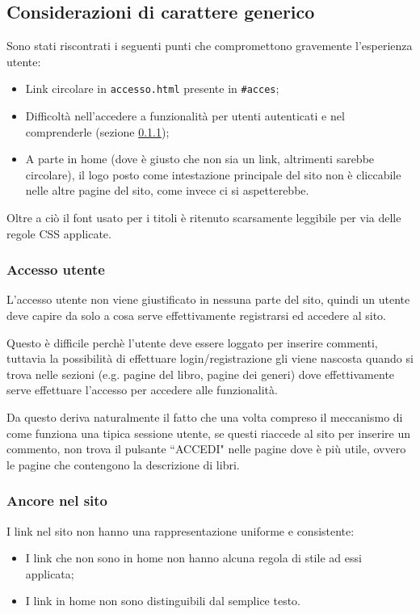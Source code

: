 \subsection{Considerazioni di carattere generico}
Sono stati riscontrati i seguenti punti che compromettono gravemente
l'esperienza utente:
\begin{itemize}
\item Link circolare in \texttt{accesso.html} presente in \texttt{\#acces};
\item Difficoltà nell'accedere a funzionalità per utenti autenticati e nel
comprenderle (sezione \ref{sec:user-login});
\item A parte in home (dove è giusto che non sia un link, altrimenti sarebbe
circolare), il logo posto come intestazione principale del sito non è
cliccabile nelle altre pagine del sito, come invece ci si aspetterebbe.
\end{itemize}

Oltre a ciò il font usato per i titoli è ritenuto scarsamente leggibile per
via delle regole CSS applicate.

\subsubsection{Accesso utente}\label{sec:user-login}
L'accesso utente non viene giustificato in nessuna parte del sito, quindi un
utente deve capire da solo a cosa serve effettivamente registrarsi ed accedere
al sito.

Questo è difficile perchè l'utente deve essere loggato per inserire commenti,
tuttavia la possibilità di effettuare login/registrazione gli viene nascosta
quando si trova nelle sezioni (e.g. pagine del libro, pagine dei generi) dove
effettivamente serve effettuare l'accesso per accedere alle funzionalità.

Da questo deriva naturalmente il fatto che una volta compreso il meccanismo di
come funziona una tipica sessione utente, se questi riaccede al sito per
inserire un commento, non trova il pulsante ``ACCEDI" nelle pagine dove è più
utile, ovvero le pagine che contengono la descrizione di libri.

\subsubsection{Ancore nel sito}\label{sec:user-ancore}
I link nel sito non hanno una rappresentazione uniforme e consistente:
\begin{itemize}
\item I link che non sono in home non hanno alcuna regola di stile ad essi
applicata;
\item I link in home non sono distinguibili dal semplice testo.
\end{itemize}


